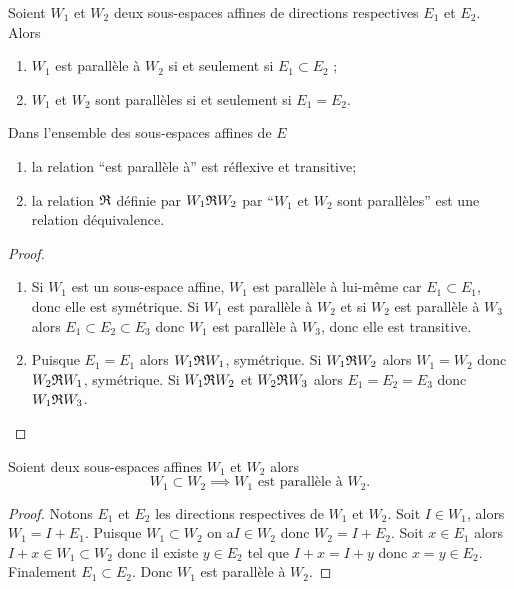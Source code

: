 \begin{defdef}
  Soient \(W_1\) et \(W_2\) deux sous-espaces affines de directions respectives \(E_1\) et \(E_2\). Alors
  \begin{enumerate}
  \item \(W_1\) est parallèle à \(W_2\) si et seulement si \(E_1 \subset E_2\) ;
  \item \(W_1\) et \(W_2\) sont parallèles si et seulement si \(E_1=E_2\).
  \end{enumerate}
\end{defdef}
%
\begin{prop}
  Dans l'ensemble des sous-espaces affines de \(E\)
  \begin{enumerate}
  \item la relation ``est parallèle à'' est réflexive et transitive;
  \item la relation \(\mathfrak{R}{}\) définie par \(W_1\mathfrak{R}{}W_2\) par ``\(W_1\) et \(W_2\) sont parallèles'' est une relation déquivalence.
  \end{enumerate}
\end{prop}
\begin{proof}
  \begin{enumerate}
  \item Si \(W_1\) est un sous-espace affine, \(W_1\) est parallèle à lui-même car \(E_1 \subset E_1\), donc elle est symétrique. Si \(W_1\) est parallèle à \(W_2\) et si \(W_2\) est parallèle à \(W_3\) alors \(E_1 \subset E_2 \subset E_3\) donc \(W_1\) est parallèle à \(W_3\), donc elle est transitive.
  \item Puisque \(E_1=E_1\) alors \(W_1\mathfrak{R}{}W_1\), symétrique. Si \(W_1 \mathfrak{R}{}W_2\) alors \(W_1=W_2\) donc \(W_2\mathfrak{R}{}W_1\), symétrique. Si \(W_1 \mathfrak{R}{}W_2\) et \(W_2\mathfrak{R}{}W_3\) alors \(E_1=E_2=E_3\) donc \(W_1\mathfrak{R}{}W_3\).
  \end{enumerate}
\end{proof}
%
\begin{prop}
  Soient deux sous-espaces affines \(W_1\) et \(W_2\) alors
  \begin{equation}
    W_1 \subset W_2 \implies W_1 \text{~est parallèle à } W_2.
  \end{equation}
\end{prop}
\begin{proof}
  Notons \(E_1\) et \(E_2\) les directions respectives de \(W_1\) et \(W_2\). Soit \(I \in W_1\), alors \(W_1 = I+E_1\). Puisque \(W_1 \subset W_2\) on a\(I \in W_2\) donc \(W_2 = I+E_2\). Soit \(x \in E_1\) alors \(I+x \in W_1 \subset W_2\) donc il existe \(y \in E_2\) tel que \(I+x=I+y\) donc \(x=y \in E_2\). Finalement \(E_1 \subset E_2\). Donc \(W_1\) est parallèle à \(W_2\).
\end{proof}

